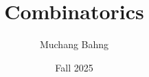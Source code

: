 \documentclass{article}
\begin{document}
\title{Combinatorics}
\author{Muchang Bahng}
\date{Fall 2025}

\maketitle
\tableofcontents
\pagebreak
\end{document}
